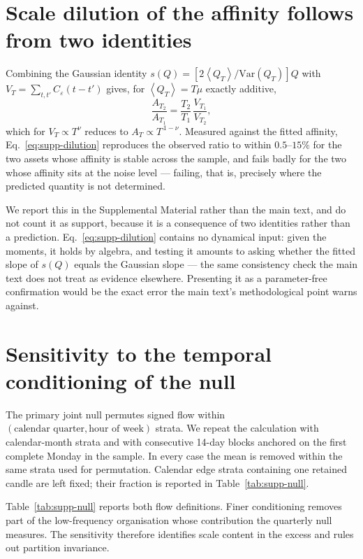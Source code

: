 \documentclass[aps,pre,onecolumn,superscriptaddress,floatfix,nofootinbib]{revtex4-2}
\newcommand{\avg}[1]{\left\langle #1 \right\rangle}
\newcommand{\Var}{\mathrm{Var}}
\newcommand{\eps}{\varepsilon}
\begin{document}
\section{Scale dilution of the affinity follows from two identities}

Combining the Gaussian identity $s(Q)=[2\avg{Q_T}/\Var(Q_T)]Q$ with
$V_T=\sum_{t,t'}C_\eps(t-t')$ gives, for $\avg{Q_T}=T\mu$ exactly additive,
\begin{equation}
  \frac{A_{T_2}}{A_{T_1}}=\frac{T_2}{T_1}\,\frac{V_{T_1}}{V_{T_2}} ,
  \label{eq:supp-dilution}
\end{equation}
which for $V_T\propto T^{\nu}$ reduces to $A_T\propto T^{\,1-\nu}$. Measured
against the fitted affinity, Eq.~\eqref{eq:supp-dilution} reproduces the
observed ratio to within $0.5$--$15\%$ for the two assets whose affinity is
stable across the sample, and fails badly for the two whose affinity sits at
the noise level --- failing, that is, precisely where the predicted quantity is
not determined.

We report this in the Supplemental Material rather than the main text, and do not
count it as support, because it is a consequence of two identities rather than
a prediction. Eq.~\eqref{eq:supp-dilution} contains no dynamical input: given
the moments, it holds by algebra, and testing it amounts to asking whether the
fitted slope of $s(Q)$ equals the Gaussian slope --- the same consistency check
the main text does not treat as evidence elsewhere. Presenting it as a parameter-free
confirmation would be the exact error the main text's methodological point warns
against.

\section{Sensitivity to the temporal conditioning of the null}

The primary joint null permutes signed flow within
$(\text{calendar quarter},\text{hour of week})$ strata. We repeat the
calculation with calendar-month strata and with consecutive
14-day blocks anchored on the first complete Monday in the sample. In every
case the mean is removed within the same strata used for permutation. Calendar
edge strata containing one retained candle are left fixed; their fraction is
reported in Table~\ref{tab:supp-null}.

Table~\ref{tab:supp-null} reports both flow definitions. Finer conditioning
removes part of the low-frequency organisation whose contribution the
quarterly null measures. The sensitivity therefore identifies scale content in
the excess and rules out partition invariance.
\end{document}
